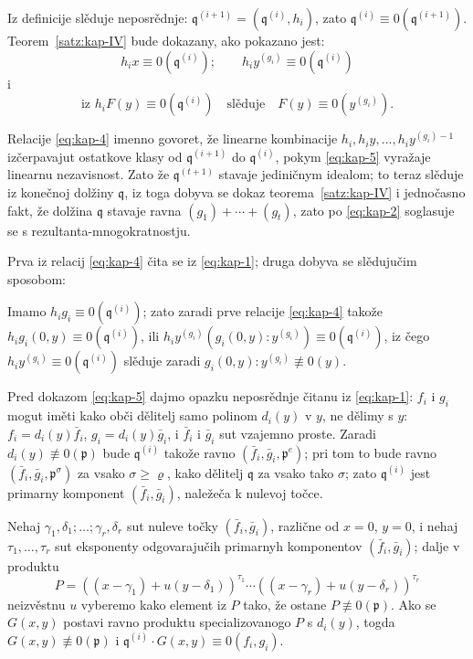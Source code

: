 \documentclass[11pt]{article}
\theoremstyle{plain}
\begin{document}
Iz definicije slěduje neposrědnje:
$\mathfrak{q}^{(i+1)} = (\mathfrak{q}^{(i)}, h_{i})$, zato
$\mathfrak{q}^{(i)} \equiv 0(\mathfrak{q}^{(i+1)})$.
Teorem~\ref{satz:kap-IV} bude dokazany, ako pokazano jest:
\begin{equation}\label{eq:kap-4}
h_{i}x \equiv 0(\mathfrak{q}^{(i)}); \qquad
h_{i}y^{(g_{i})} \equiv 0(\mathfrak{q}^{(i)})
\end{equation}
i
\begin{equation}\label{eq:kap-5}
\text{iz } h_{i}F(y) \equiv 0(\mathfrak{q}^{(i)})
\quad \text{slěduje} \quad F(y) \equiv 0(y^{(g_{i})}).
\end{equation}

Relacije \eqref{eq:kap-4} imenno govoret, že linearne kombinacije
$h_{i}, h_{i}y, \ldots, h_{i}y^{(g_{i})-1}$ izčerpavajut
ostatkove klasy od $\mathfrak{q}^{(i+1)}$ do
$\mathfrak{q}^{(i)}$, pokym \eqref{eq:kap-5} vyražaje linearnu
nezavisnost. Zato že $\mathfrak{q}^{(t+1)}$ stavaje jediničnym
idealom; to teraz slěduje iz konečnoj dolžiny $\mathfrak{q}$,
iz toga dobyva se dokaz teorema~\ref{satz:kap-IV} i jednočasno
fakt, že dolžina $\mathfrak{q}$ stavaje ravna
$(g_{1}) + \cdots + (g_{t})$, zato po \eqref{eq:kap-2} soglasuje se
s rezultanta-mnogokratnostju.

Prva iz relacij \eqref{eq:kap-4} čita se iz \eqref{eq:kap-1};
druga dobyva se slědujučim sposobom:

Imamo $h_{i}g_{i} \equiv 0(\mathfrak{q}^{(i)})$; zato zaradi prve
relacije \eqref{eq:kap-4} takože
$h_{i}g_{i}(0,y) \equiv 0(\mathfrak{q}^{(i)})$, ili
$h_{i}y^{(g_{i})}(g_{i}(0,y):y^{(g_{i})}) \equiv 0(\mathfrak{q}^{(i)})$,
iz čego $h_{i}y^{(g_{i})} \equiv 0(\mathfrak{q}^{(i)})$
slěduje zaradi $g_{i}(0,y):y^{(g_{i})} \not\equiv 0(y)$.

Pred dokazom \eqref{eq:kap-5} dajmo opazku neposrědnje čitanu iz
\eqref{eq:kap-1}: $f_{i}$ i $g_{i}$ mogut iměti kako obči dělitelj
samo polinom $d_{i}(y)$ v $y$, ne dělimy s $y$:
$f_{i} = d_{i}(y)\bar{f}_{i}$, $g_{i} = d_{i}(y)\bar{g}_{i}$, i
$\bar{f}_{i}$ i $\bar{g}_{i}$ sut vzajemno proste. Zaradi
$d_{i}(y) \not\equiv 0(\mathfrak{p})$ bude $\mathfrak{q}^{(i)}$
takože ravno $(\bar{f}_{i}, \bar{g}_{i}, \mathfrak{p}^{e})$;
pri tom to bude ravno
$(\bar{f}_{i}, \bar{g}_{i}, \mathfrak{p}^{\sigma})$ za vsako
$\sigma \geq \varrho$, kako dělitelj $\mathfrak{q}$ za vsako
tako $\sigma$; zato $\mathfrak{q}^{(i)}$ jest primarny komponent
$(\bar{f}_{i}, \bar{g}_{i})$, naležeča k nulevoj točce.

Nehaj $\gamma_{1}, \delta_{1}; \ldots; \gamma_{r}, \delta_{r}$ sut
nuleve točky $(\bar{f}_{i}, \bar{g}_{i})$, različne od
$x = 0$, $y = 0$, i nehaj $\tau_{1}, \ldots, \tau_{r}$ sut eksponenty
odgovarajučih primarnyh komponentov $(\bar{f}_{i}, \bar{g}_{i})$;
dalje v produktu
\[
P = ((x-\gamma_{1}) + u(y-\delta_{1}))^{\tau_{1}} \cdots
((x-\gamma_{r}) + u(y-\delta_{r}))^{\tau_{r}}
\]
neizvěstnu $u$ vyberemo kako element iz $P$ tako, že ostane
$P \not\equiv 0(\mathfrak{p})$. Ako se $G(x,y)$ postavi ravno
produktu specializovanogo $P$ s $d_{i}(y)$, togda
$G(x,y) \not\equiv 0(\mathfrak{p})$ i
$\mathfrak{q}^{(i)} \cdot G(x,y) \equiv 0(f_{i}, g_{i})$.
\end{document}
